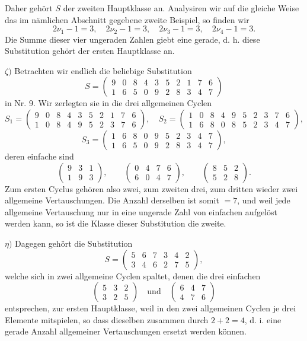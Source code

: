 \documentclass[10pt]{article}
\begin{document}
Daher gehört \(S\) der zweiten Hauptklasse an. Analysiren wir auf die gleiche Weise das im nämlichen Abschnitt gegebene zweite Beispiel, so finden wir
\[
2\nu_1-1=3,\quad 2\nu_2-1=3,\quad 2\nu_3-1=3,\quad 2\nu_4-1=3.
\]
Die Summe dieser vier ungeraden Zahlen giebt eine gerade, d. h. diese Substitution gehört der ersten Hauptklasse an.

\(\zeta)\) Betrachten wir endlich die beliebige Substitution
\[
S=\begin{pmatrix}9&0&8&4&3&5&2&1&7&6\\1&6&5&0&9&2&8&3&4&7\end{pmatrix}
\]
in Nr. 9. Wir zerlegten sie in die drei allgemeinen Cyclen
\[
S_1=\begin{pmatrix}9&0&8&4&3&5&2&1&7&6\\1&0&8&4&9&5&2&3&7&6\end{pmatrix},
\quad
S_2=\begin{pmatrix}1&0&8&4&9&5&2&3&7&6\\1&6&8&0&8&5&2&3&4&7\end{pmatrix},
\]
\[
S_3=\begin{pmatrix}1&6&8&0&9&5&2&3&4&7\\1&6&5&0&9&2&8&3&4&7\end{pmatrix},
\]
deren einfache sind
\[
\begin{pmatrix}9&3&1\\1&9&3\end{pmatrix},\qquad
\begin{pmatrix}0&4&7&6\\6&0&4&7\end{pmatrix},\qquad
\begin{pmatrix}8&5&2\\5&2&8\end{pmatrix}.
\]
Zum ersten Cyclus gehören also zwei, zum zweiten drei, zum dritten wieder zwei allgemeine Vertauschungen. Die Anzahl derselben ist somit \(=7\), und weil jede allgemeine Vertauschung nur in eine ungerade Zahl von einfachen aufgelöst werden kann, so ist die Klasse dieser Substitution die zweite.

\(\eta)\) Dagegen gehört die Substitution
\[
S=\begin{pmatrix}5&6&7&3&4&2\\3&4&6&2&7&5\end{pmatrix},
\]
welche sich in zwei allgemeine Cyclen spaltet, denen die drei einfachen
\[
\begin{pmatrix}5&3&2\\3&2&5\end{pmatrix}
\quad\text{und}\quad
\begin{pmatrix}6&4&7\\4&7&6\end{pmatrix}
\]
entsprechen, zur ersten Hauptklasse, weil in den zwei allgemeinen Cyclen je drei Elemente mitspielen, so dass dieselben zusammen durch \(2+2=4\), d. i. eine gerade Anzahl allgemeiner Vertauschungen ersetzt werden können.
\end{document}
